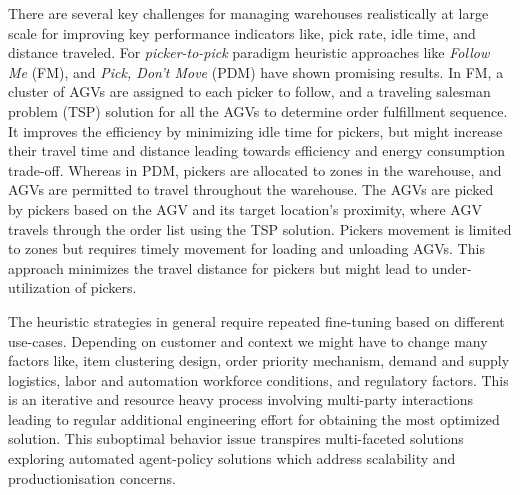 \documentclass{article}
\begin{document}


There are several key challenges for managing warehouses realistically at large scale for improving key performance indicators like, pick rate, idle time, and distance traveled.
For \textit{picker-to-pick} paradigm heuristic approaches like \textit{Follow Me} (FM), and \textit{Pick, Don’t Move} (PDM) have shown promising results.
In FM, a cluster of AGVs are assigned to each picker to follow, and a traveling salesman problem (TSP) solution for all the AGVs to determine order fulfillment sequence.
It improves the efficiency by minimizing idle time for pickers, but might increase their travel time and distance leading towards efficiency and energy consumption trade-off.
Whereas in PDM, pickers are allocated to zones in the warehouse, and AGVs are permitted to travel throughout the warehouse.
The AGVs are picked by pickers based on the AGV and its target location’s proximity, where AGV travels through the order list using the TSP solution.
Pickers movement is limited to zones but requires timely movement for loading and unloading AGVs.
This approach minimizes the travel distance for pickers but might lead to under-utilization of pickers.


The heuristic strategies in general require repeated fine-tuning based on different use-cases.
Depending on customer and context we might have to change many factors like, item clustering design, order priority mechanism, demand and supply logistics, labor and automation workforce conditions, and regulatory factors.
This is an iterative and resource heavy process involving multi-party interactions leading to regular additional engineering effort for obtaining the most optimized solution.
This suboptimal behavior issue transpires multi-faceted solutions exploring automated agent-policy solutions which address scalability and productionisation concerns.
\end{document}
